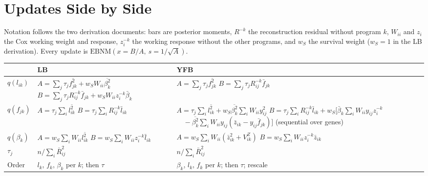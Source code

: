 \documentclass[11pt]{article}
\newcommand{\ws}{w_S}
\begin{document}
\section{Updates Side by Side}

Notation follows the two derivation documents: bars are posterior moments,
$R^{-k}$ the reconstruction residual without program $k$, $W_{ii}$ and $z_i$ the
Cox working weight and response, $z^{-k}_i$ the working response without the
other programs, and $\ws$ the survival weight ($\ws = 1$ in the LB derivation).
Every update is $\mathrm{EBNM}(x = B/A,\ s = 1/\sqrt A)$.

\begin{center}
\renewcommand{\arraystretch}{1.35}
\begin{tabularx}{\textwidth}{>{\raggedright\arraybackslash}p{1.4cm}LL}
\toprule
 & LB & YFB \\
\midrule
$q(l_{ik})$ &
$A = \sum_j\tau_j\overline{f^2_{jk}} + \ws W_{ii}\overline{\beta^2_k}$\newline
$B = \sum_j\tau_jR^{-k}_{ij}\bar f_{jk} + \ws W_{ii}z^{-k}_i\bar\beta_k$ &
$A = \sum_j\tau_j\overline{f^2_{jk}}$\newline
$B = \sum_j\tau_jR^{-k}_{ij}\bar f_{jk}$ \\
$q(f_{jk})$ &
$A = \tau_j\sum_i\overline{l^2_{ik}}$\newline
$B = \tau_j\sum_iR^{-k}_{ij}\bar l_{ik}$ &
$A = \tau_j\sum_i\overline{l^2_{ik}} + \ws\overline{\beta^2_k}\sum_iW_{ii}y_{ij}^2$\newline
$B = \tau_j\sum_iR^{-k}_{ij}\bar l_{ik} + \ws\bigl[\bar\beta_k\sum_iW_{ii}y_{ij}z^{-k}_i$\newline
$\quad - \overline{\beta^2_k}\sum_iW_{ii}y_{ij}(\bar z_{ik} - y_{ij}\bar f_{jk})\bigr]$\newline
(sequential over genes) \\
$q(\beta_k)$ &
$A = \ws\sum_iW_{ii}\overline{l^2_{ik}}$\newline
$B = \ws\sum_iW_{ii}z^{-k}_i\bar l_{ik}$ &
$A = \ws\sum_iW_{ii}(\bar z_{ik}^2 + V^Z_{ik})$\newline
$B = \ws\sum_iW_{ii}z^{-k}_i\bar z_{ik}$ \\
$\tau_j$ & $n/\sum_i\bar R^2_{ij}$ & $n/\sum_i\bar R^2_{ij}$ \\
Order & $l_k$, $f_k$, $\beta_k$ per $k$; then $\tau$ & $\beta_k$, $l_k$, $f_k$ per $k$; then $\tau$; rescale \\
\bottomrule
\end{tabularx}
\end{center}
\end{document}
